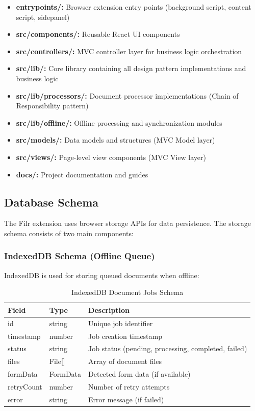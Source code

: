 \documentclass[11pt, a4paper]{article}
\theoremstyle{plain}
\theoremstyle{definition}
\begin{document}
\begin{itemize}
    \item \textbf{entrypoints/:} Browser extension entry points (background script, content script, sidepanel)
    \item \textbf{src/components/:} Reusable React UI components
    \item \textbf{src/controllers/:} MVC controller layer for business logic orchestration
    \item \textbf{src/lib/:} Core library containing all design pattern implementations and business logic
    \item \textbf{src/lib/processors/:} Document processor implementations (Chain of Responsibility pattern)
    \item \textbf{src/lib/offline/:} Offline processing and synchronization modules
    \item \textbf{src/models/:} Data models and structures (MVC Model layer)
    \item \textbf{src/views/:} Page-level view components (MVC View layer)
    \item \textbf{docs/:} Project documentation and guides
\end{itemize}

\subsection{Database Schema}

The Filr extension uses browser storage APIs for data persistence. The storage schema consists of two main components:

\subsubsection{IndexedDB Schema (Offline Queue)}

IndexedDB is used for storing queued documents when offline:

\begin{table}[H]
\centering
\caption{IndexedDB Document Jobs Schema}
\label{tab:indexeddb-schema}
\begin{tabularx}{\textwidth}{lXl}
\toprule
\textbf{Field} & \textbf{Type} & \textbf{Description} \\
\midrule
id & string & Unique job identifier \\
timestamp & number & Job creation timestamp \\
status & string & Job status (pending, processing, completed, failed) \\
files & File[] & Array of document files \\
formData & FormData & Detected form data (if available) \\
retryCount & number & Number of retry attempts \\
error & string & Error message (if failed) \\
\bottomrule
\end{tabularx}
\end{table}
\end{document}

